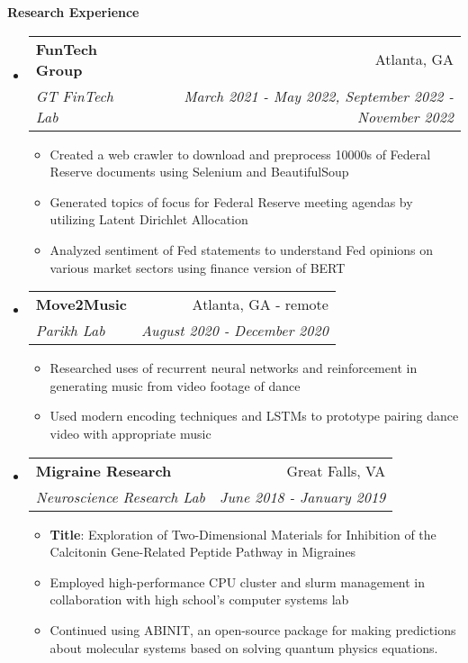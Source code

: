 \documentclass[letterpaper,11pt]{article}
\makeatletter
\newcommand{\resitem}[1]{\item #1 \vspace{-2pt}}
\newcommand{\resheading}[1]{{\large \colorbox{mygrey}{\begin{minipage}{\textwidth}{\textbf{#1 \vphantom{p\^{E}}}}\end{minipage}}}}
\newcommand{\ressubheading}[4]{
\begin{tabular*}{7.0in}{l@{\extracolsep{\fill}}r}
		\textbf{#1} & #2 \\
		\textit{#3} & \textit{#4} \\
\end{tabular*}\vspace{-6pt}}
\makeatother
\begin{document}
\resheading{Research Experience}
\begin{itemize}
\item
    \ressubheading{FunTech Group}{Atlanta, GA}{GT FinTech Lab}{March 2021 - May 2022, September 2022 - November 2022}
    \begin{itemize}
        \resitem{Created a web crawler to download and preprocess 10000s of Federal Reserve documents using Selenium and BeautifulSoup}
        \resitem{Generated topics of focus for Federal Reserve meeting agendas by utilizing Latent Dirichlet Allocation}
        \resitem{Analyzed sentiment of Fed statements to understand Fed opinions on various market sectors using finance version of BERT}
    \end{itemize}
\item
    \ressubheading{Move2Music}{Atlanta, GA - remote}{Parikh Lab}{August 2020 - December 2020}
    \begin{itemize}
        \resitem{Researched uses of recurrent neural networks and reinforcement in generating music from video footage of dance}
        \resitem{Used modern encoding techniques and LSTMs to prototype pairing dance video with appropriate music}
    \end{itemize}
\item
	\ressubheading{Migraine Research}{Great Falls, VA}{Neuroscience Research Lab}{June 2018 - January 2019}
	\begin{itemize}
		\resitem{\textbf{Title}: Exploration of Two-Dimensional Materials for Inhibition of the Calcitonin Gene-Related Peptide Pathway in Migraines}
	    \resitem{Employed high-performance CPU cluster and slurm management in collaboration with high school's computer systems lab}
	    \resitem{Continued using ABINIT, an open-source package for making predictions about molecular systems based on solving quantum physics equations.}

\end{itemize}
\end{itemize}
\end{document}
